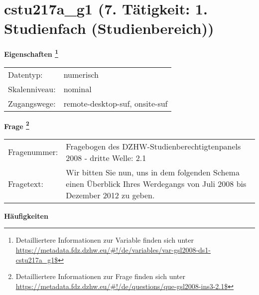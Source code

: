 
    \setcounter{footnote}{0}

    \vspace*{-1.8cm}
	\section{cstu217a\_g1 (7. Tätigkeit: 1. Studienfach (Studienbereich))}
	\label{section:cstu217a_g1}



    \vspace*{0.5cm}
    \noindent\textbf{Eigenschaften
	\footnote{Detailliertere Informationen zur Variable finden sich unter
		\url{https://metadata.fdz.dzhw.eu/\#!/de/variables/var-gsl2008-ds1-cstu217a_g1$}}}\\
	\begin{tabularx}{\hsize}{@{}lX}
	Datentyp: & numerisch \\
	Skalenniveau: & nominal \\
	Zugangswege: &
	  remote-desktop-suf, 
	  onsite-suf
 \\
    \end{tabularx}



				\vspace*{0.5cm}
                \noindent\textbf{Frage
	                \footnote{Detailliertere Informationen zur Frage finden sich unter
		              \url{https://metadata.fdz.dzhw.eu/\#!/de/questions/que-gsl2008-ins3-2.1$}}}\\
				\begin{tabularx}{\hsize}{@{}lX}
					Fragenummer: &
					  Fragebogen des DZHW-Studienberechtigtenpanels 2008 - dritte Welle:
					  2.1
 \\
					Fragetext: & Wir bitten Sie nun, uns in dem folgenden Schema einen Überblick Ihres Werdegangs von Juli 2008 bis Dezember 2012 zu geben. \\
				\end{tabularx}





        		\vspace*{0.5cm}
                \noindent\textbf{Häufigkeiten}

